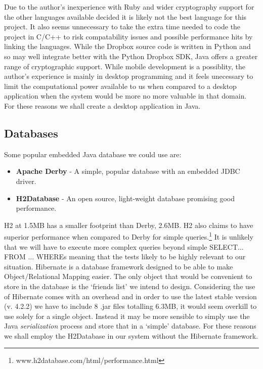 \documentclass[12pt, titlepage]{article}
\begin{document}
\newline Due to the author's inexperience with Ruby and wider cryptography support for the other languages available decided it is likely not the best language for this project. It also seems unnecessary to take the extra time needed to code the project in C/C++ to risk compatability issues and possible performance hits by linking the languages. While the Dropbox source code is written in Python and so may well integrate better with the Python Dropbox SDK, Java offers a greater range of cryptographic support.
\newline \indent While mobile development is a possiblity, the author's experience is mainly in desktop programming and it feels unecessary to limit the computational power available to us when compared to a desktop application when the system would be more no more valuable in that domain.
\newline \indent For these reasons we shall create a desktop application in Java.

\subsection{Databases}
Some popular embedded Java database we could use are:
\begin{itemize}
	\item \textbf{Apache Derby} - A simple, popular database with an embedded JDBC driver.
	\item \textbf{H2Database} - An open source, light-weight database promising good performance.
\end{itemize}
H2 at 1.5MB has a smaller footprint than Derby, 2.6MB. H2 also claims to have superior performance when compared to Derby for simple queries.\footnote{www.h2database.com/html/performance.html} It is unlikely that we will have to execute more complex queries beyond simple SELECT... FROM ... WHEREs meaning that the tests likely to be highly relevant to our situation.
\newline \indent Hibernate is a database framework designed to be able to make Object/Relational Mapping easier. The only object that would be convenient to store in the database is the `friends list' we intend to design. Considering the use of Hibernate comes with an overhead and in order to use the latest stable version (v. 4.2.2) we have to include 8 .jar files totalling 6.3MB, it would seem overkill to use solely for a single object. Instead it may be more sensible to simply use the Java \textit{serialization} process and store that in a `simple' database.
\newline \indent For these reasons we shall employ the H2Database in our system without the Hibernate framework.
\end{document}
